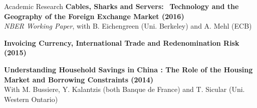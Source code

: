 \documentclass[usegeometry, 10pt, a4paper]{cv} %
\newcommand{\activite}[1]{\textbf{#1}\ }
\begin{document}
\begin{rubriquetableau}[0.95\textwidth]{Academic Research}
\small
\activite{Cables, Sharks and Servers:}
\activite{Technology and the Geography of the Foreign Exchange Market (2016)}\\
\hspace{0.6cm} \small{\emph{NBER Working Paper}, with B. Eichengreen (Uni. Berkeley) and A. Mehl (ECB)}
\vspace{0.4cm} 
    
\activite{Invoicing Currency, International Trade and Redenomination Risk (2015)} \\
\vspace{0.2cm} 

\small
\activite{Understanding Household Savings in China : The Role of the Housing Market and Borrowing Constraints (2014)}  \\
\hspace{0.6cm} \small{With M. Bussiere, Y. Kalantzis (both Banque de France) and T. Sicular (Uni. Western
  Ontario)} \\
\end{rubriquetableau}



\vspace{0.8cm}
\end{document}
